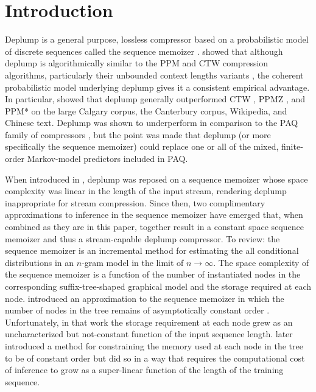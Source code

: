 \section{Introduction}
\label{sec:introduction}

Deplump \citep{Gasthaus2010} is a general purpose, lossless compressor based on a probabilistic model of discrete sequences called the sequence memoizer \citep{Wood2009}.   \citeauthor{Gasthaus2010} showed that although deplump is algorithmically similar to the PPM and CTW compression algorithms, particularly their unbounded context lengths variants \citep{Cleary1997,Willems1998}, the coherent probabilistic model underlying deplump gives it a consistent empirical advantage.  In particular, \citeauthor{Gasthaus2010} showed that deplump generally outperformed CTW  \citep{Willems2009}, PPMZ \citep{Peltola2002}, and PPM* \citep{Cleary1997} on the large Calgary corpus, the Canterbury corpus, Wikipedia, and Chinese text.  Deplump was shown to underperform in comparison to the PAQ family of compressors \citep{Mahoney2005}, but the point was made that deplump (or more specifically the sequence memoizer) could replace one or all of the mixed, finite-order Markov-model predictors included in PAQ.  

When introduced in \citep{Gasthaus2010}, deplump was reposed on a sequence memoizer whose space complexity was linear in the length of the input stream, rendering deplump inappropriate for stream compression.  Since then, two complimentary approximations to inference in the sequence memoizer have emerged that, when combined as they are in this paper, together result in a constant space sequence memoizer and thus a stream-capable deplump compressor. To review: the sequence memoizer is an incremental method for estimating the all conditional distributions in an $n$-gram model in the limit of $n\rightarrow\infty$.  The space complexity of the sequence memoizer is a function of the number of instantiated nodes in the corresponding suffix-tree-shaped graphical model and the storage required at each node. \citeauthor{Bartlett2010} introduced an approximation to the sequence memoizer in which the number of nodes in the tree remains of asymptotically constant order \citep{Bartlett2010}.  Unfortunately, in that work the storage requirement at each node grew as an uncharacterized but not-constant function of the input sequence length.  \citeauthor{Gasthaus2011} later introduced a method for constraining the memory used at each node in the tree to be of constant order  \citep{Gasthaus2011} but did so in a way that requires the computational cost of inference to grow as a super-linear function of the length of the training sequence.

